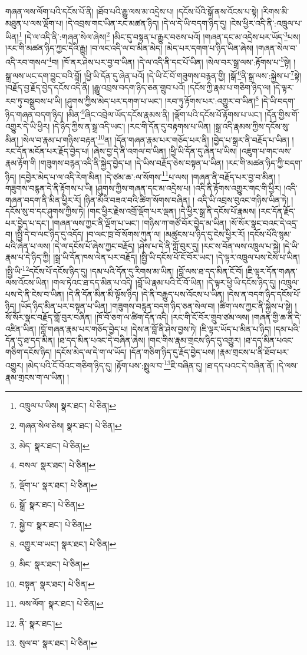 གཞན་ལས་ལོག་པའི་དངོས་པོ་ནི། །ཐོབ་པའི་རྒྱུ་ལས་མ་འདྲེས་པ། །དངོས་པོའི་སྒོ་ནས་འོངས་པ་སྟེ། །རིགས་མི་མཐུན་པ་ལས་ལྡོག་པ། །དེ་འབྲས་གང་ཡིན་རང་མཚན་ཉིད། །དེ་ལ་དེ་ཡི་བདག་ཉིད་དུ། །ངེས་ཕྱིར་འདི་ནི་:འཁྲུལ་པ་ཡིན།\footnote{འཁྲུལ་པ་ཡིས།  སྣར་ཐང་།  པེ་ཅིན། } །དེ་ལ་འདི་ནི་:གཞན་སེལ་ཞེས།\footnote{གཞན་སེལ་ཅེས།  སྣར་ཐང་།  པེ་ཅིན། } །མིང་དུ་བསྟན་པ་རྒྱུར་བཅས་པའོ། །གཞན་དང་མ་འདྲེས་པར་ཡོད་\footnote{མེད་  སྣར་ཐང་།  པེ་ཅིན། }པས། །རང་གི་མཚན་ཉིད་ཀྱང་དེའི་རྒྱུ། །བ་ལང་འདི་ལ་བ་མིན་མེད། །མེད་པར་དགག་པ་ཉིད་ཡིན་ཞེས། །གཞན་སེལ་བ་འདི་རབ་གསལ་\footnote{བསལ་  སྣར་ཐང་།  པེ་ཅིན། }བ། །ཁོ་ནར་ཤེས་པར་བྱ་བ་ཡིན། །དེ་ལ་འདི་ནི་དང་པོ་ཡིན། །སེལ་བར་སྒྲ་ལས་:རྟོགས་པ་\footnote{ལྡོག་པ་  སྣར་ཐང་།  པེ་ཅིན། }སྟེ། །སྒྲ་ལས་ཡང་དག་བྱུང་བའི་བློ། །ཕྱི་ཡི་དོན་དུ་ཞེན་པའོ། །དེ་ཡི་ངོ་བོ་གཟུགས་བརྙན་གྱི། །སྒོ་\footnote{སྒྲོ་  སྣར་ཐང་།  པེ་ཅིན། }ནི་སྒྲ་ལས་:སྐྱེས་པ་\footnote{སྐྱེ་བ་  སྣར་ཐང་།  པེ་ཅིན། }སྟེ། །བརྗོད་བྱ་རྗོད་བྱེད་དངོས་འདི་ནི། །རྒྱུ་འབྲས་བདག་ཉིད་ཅན་གྲུབ་པའོ། །དངོས་ཀྱི་རྣམ་པ་གཅིག་ཉིད་ལ། །དེ་ལྟར་རབ་ཏུ་བསྒྲུབས་པ་ཡི། །ཤུགས་ཀྱིས་མེད་པར་དགག་པ་ཡང་། །རབ་ཏུ་རྟོགས་པར་:འགྱུར་བ་ཡིན།\footnote{འགྱུར་བ་ཡང་།  སྣར་ཐང་།  པེ་ཅིན། } །དེ་ཡི་བདག་ཉིད་གཞན་བདག་ཉིད། །མིན་\footnote{མིང་  སྣར་ཐང་།  པེ་ཅིན། }ཞིང་འབྲེལ་ཡོད་དངོས་རྣམས་ནི། །ལྡོག་པའི་དངོས་པོ་རྟོགས་པ་ཡང་། །དོན་གྱིས་གོ་འགྱུར་དེ་ཡི་ཕྱིར། །དེ་ཉིད་ཀྱིས་ན་སྒྲ་འདི་ཡང་། །རང་གི་དོན་དུ་བརྟགས་པ་ཡིན། །སྒྲ་འདི་རྣམས་ཀྱིས་དངོས་སུ་མིན། །སེལ་བ་རྣམ་པ་གཉིས་བརྟན་\footnote{བསྟན་  སྣར་ཐང་།  པེ་ཅིན། }ན། །དོན་གཞན་རྣམ་པར་གཅོད་པར་ནི། །བྱེད་པ་སྒྲར་ནི་བརྗོད་པ་ཡིན། །རང་དོན་མངོན་པར་རྗོད་བྱེད་པ། །ཞེས་བྱ་དེ་ནི་འགལ་བ་ཡིན། །ཕྱི་ཡི་དོན་དུ་ཞེན་པ་ཡིས། །འཇུག་པ་གང་ལས་རྣམ་རྟོག་གི །གཟུགས་བརྙན་འདི་ནི་སྐྱེད་བྱེད་པ། །དེ་ཡིས་བརྗོད་ཅེས་བསྟན་པ་ཡིན། །རང་གི་མཚན་ཉིད་ཀྱི་བདག་ཉིད། །དབྱེར་མེད་པ་ལ་འདི་རེག་མིན། །དེ་ཙམ་ཆ་:ལ་སོགས་\footnote{ལས་ལོག་  སྣར་ཐང་།  པེ་ཅིན། }པ་ལས། །གཞན་ནི་བརྗོད་པར་བྱ་བ་མིན། །གཟུགས་བརྙན་དེ་ནི་རྟོགས་པ་ཡི། །ཤུགས་ཀྱིས་གཞན་དང་མ་འདྲེས་པ། །འདི་ནི་རྟོགས་འགྱུར་གང་གི་ཕྱིར། །འདི་གཞན་བདག་ནི་མིན་ཕྱིར་རོ། །ཉིན་མོའི་བཟའ་བའི་ཚིག་སོགས་བཞིན། །
འདི་ཡི་འབྲས་བུའང་གཉིས་ཡིན་ཏེ། །དངོས་སུ་བ་དང་ཤུགས་ཀྱིས་ཏེ། །གང་ཕྱིར་རྗེས་འགྲོ་ལྡོག་པར་ལྡན། །དེ་ཕྱིར་སྒྲ་ནི་དངོས་པོ་རྣམས། །རང་དོན་རྗོད་པར་བྱེད་པ་དང་། །གཞན་ལས་ཀྱང་ནི་ལྡོག་པ་ཡང་། །གཉིས་ཀ་གཙོ་བོར་བྱེད་མ་ཡིན། །སོ་སོར་སྣང་བའང་དེ་འདྲ་བ། །སྤྱི་དེ་བ་ལང་ཉིད་དུ་འདོད། །བ་ལང་ཁྲ་བོ་སོགས་ཀུན་ལ། །མཚུངས་པ་ཉིད་དུ་ངེས་ཕྱིར་རོ། །དངོས་པོའི་སྙམ་པའི་ཞེན་པ་ལས། །དེ་ལ་དངོས་པོ་ཞེས་ཀྱང་བརྗོད། །ཤེས་པ་དེ་ནི་གློ་བུར་དུ། །རང་ས་བོན་ལས་འཁྲུལ་པ་སྐྱེ། །དེ་ཡི་རྣམ་པ་དེ་ཉིད་ཀྱི། །སྒྲ་ཡི་དོན་ཁས་ལེན་པར་བརྗོད། །སྤྱི་ཡི་དངོས་པོ་ངོ་བོར་ཡང་། །དེ་ལྟར་འཁྲུལ་པས་ངེས་པ་ཡིན། །སྤྱི་ཡི་\footnote{ནི་  སྣར་ཐང་། }དངོས་པོ་དངོས་ཉིད་དུ། །དམ་པའི་དོན་དུ་རིགས་མ་ཡིན། །བློ་ལས་ཐ་དད་མིན་ངོ་བོ། །ཇི་ལྟར་དོན་གཞན་ལས་འོངས་ཡིན། །གལ་ཏེའང་ཐ་དད་མིན་པ་འདི། །བློ་ཡི་རྣམ་པའི་ངོ་བོ་ཡིན། །དེ་ལྟར་ཕྱི་ཡི་དངོས་ཉིད་དུ། །འཁྲུལ་པས་དེ་ནི་ངེས་བ་ཡིན། །དེ་ནི་དོན་མིན་མི་ལྟོས་ཉིད། །དེ་ནི་བརྒྱུད་པས་འོངས་པ་ཡིན། །དེས་ན་བདག་ཉིད་དངོས་པོ་ཉིད། །ཡོད་ཉིད་མིན་པར་བསྟན་པ་ཡིན། །གཟུགས་བརྙན་བདག་ཉིད་ཅན་སེལ་བ། །ཚིག་ལས་ཀྱང་ནི་སྐྱེས་པ་སྟེ། །སོ་སོར་སྣང་བརྗོད་གློ་བུར་བཞིན། །ཁོ་བོ་ཅག་ལ་ཚིག་དོན་འདི། །རང་གི་ངོ་བོར་གྲུབ་ཙམ་ལས། །གཞན་གྱི་ཆ་ནི་དེ་འཛིན་ཡིན། །བློ་གཞན་རྣམ་པར་གཅོད་བྱེད་པ། །དེས་ན་བློ་ནི་ཤེས་བྱས་ཏེ། །ཇི་ལྟར་ཡོད་པ་མིན་པ་ཉིད། །དམ་པའི་དོན་དུ་ཐ་དད་མིན། །ཐ་དད་མིན་པའང་དེ་བཞིན་ཞེས། །གང་གིས་རྣམ་གྲངས་ཉིད་དུ་འགྱུར། །ཐ་དད་མིན་པའང་གཅིག་དངོས་ཉིད། །དངོས་མེད་ལ་དེ་ག་ལ་ཡོད། །དོན་གཅིག་ཉིད་དུ་རྗོད་བྱེད་པས། །རྣམ་གྲངས་པ་ནི་ཐོབ་པར་འགྱུར། །མེད་པའི་ངོ་བོའང་གཅིག་ཉིད་དུ། །རྟོག་པས་:སྤྲུལ་བ་\footnote{སུལ་བ་  སྣར་ཐང་།  པེ་ཅིན། }ཇི་བཞིན་དུ། །ཐ་དད་པའང་དེ་བཞིན་ནོ། །དེ་ལས་རྣམ་གྲངས་ག་ལ་ཡིན། །
